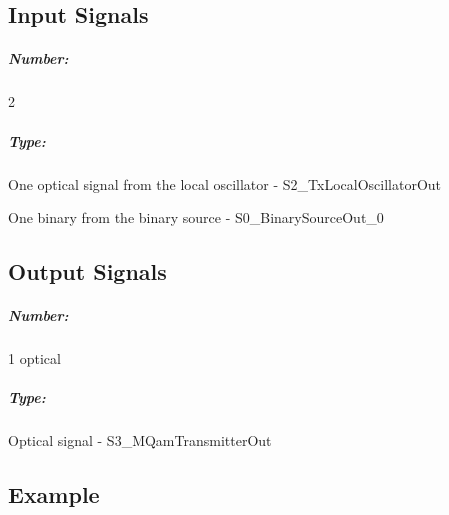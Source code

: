 \subsection*{Input Signals}

\subparagraph*{Number:} 2

\subparagraph*{Type:} One optical signal from the local oscillator - S2\_TxLocalOscillatorOut \par
One binary from the binary source - S0\_BinarySourceOut\_0

\subsection*{Output Signals}

\subparagraph*{Number:} 1 optical

\subparagraph*{Type:} Optical signal - S3\_MQamTransmitterOut

\subsection*{Example}

